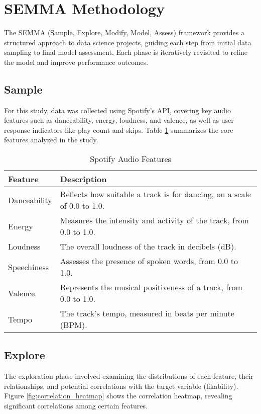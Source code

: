\documentclass[12pt]{article}
\begin{document}
\section{SEMMA Methodology}
The SEMMA (Sample, Explore, Modify, Model, Assess) framework provides a structured approach to data science projects, guiding each step from initial data sampling to final model assessment. Each phase is iteratively revisited to refine the model and improve performance outcomes.

\subsection{Sample}
For this study, data was collected using Spotify’s API, covering key audio features such as danceability, energy, loudness, and valence, as well as user response indicators like play count and skips. Table \ref{tab:features} summarizes the core features analyzed in the study.

\begin{table}[H]
\centering
\caption{Spotify Audio Features}
\label{tab:features}
\begin{tabular}{ll}
\toprule
\textbf{Feature} & \textbf{Description} \\
\midrule
Danceability & Reflects how suitable a track is for dancing, on a scale of 0.0 to 1.0. \\
Energy & Measures the intensity and activity of the track, from 0.0 to 1.0. \\
Loudness & The overall loudness of the track in decibels (dB). \\
Speechiness & Assesses the presence of spoken words, from 0.0 to 1.0. \\
Valence & Represents the musical positiveness of a track, from 0.0 to 1.0. \\
Tempo & The track's tempo, measured in beats per minute (BPM). \\
\bottomrule
\end{tabular}
\end{table}

\subsection{Explore}
The exploration phase involved examining the distributions of each feature, their relationships, and potential correlations with the target variable (likability). Figure \ref{fig:correlation_heatmap} shows the correlation heatmap, revealing significant correlations among certain features.
\end{document}

